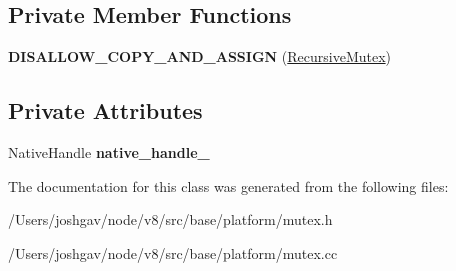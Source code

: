 \subsection*{Private Member Functions}
\begin{DoxyCompactItemize}
\item 
{\bfseries D\+I\+S\+A\+L\+L\+O\+W\+\_\+\+C\+O\+P\+Y\+\_\+\+A\+N\+D\+\_\+\+A\+S\+S\+I\+GN} (\hyperlink{classv8_1_1base_1_1_recursive_mutex}{Recursive\+Mutex})\hypertarget{classv8_1_1base_1_1_recursive_mutex_a39087d30283a5ce5f90a4200aa619d33}{}\label{classv8_1_1base_1_1_recursive_mutex_a39087d30283a5ce5f90a4200aa619d33}

\end{DoxyCompactItemize}
\subsection*{Private Attributes}
\begin{DoxyCompactItemize}
\item 
Native\+Handle {\bfseries native\+\_\+handle\+\_\+}\hypertarget{classv8_1_1base_1_1_recursive_mutex_a2b7e851641c2444e8a19a40f510252e4}{}\label{classv8_1_1base_1_1_recursive_mutex_a2b7e851641c2444e8a19a40f510252e4}

\end{DoxyCompactItemize}


The documentation for this class was generated from the following files\+:\begin{DoxyCompactItemize}
\item 
/\+Users/joshgav/node/v8/src/base/platform/mutex.\+h\item 
/\+Users/joshgav/node/v8/src/base/platform/mutex.\+cc\end{DoxyCompactItemize}
